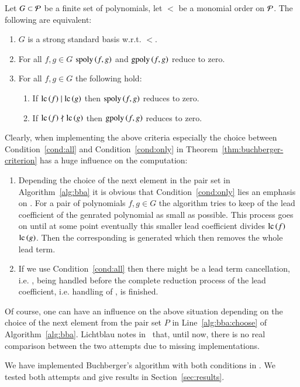\begin{theorem}
Let $G \subset \mathcal{P}$ be a finite set of polynomials, let $<$ be a monomial order
on $\mathcal{P}$. The following are equivalent:
\begin{enumerate}
\item $G$ is a strong standard basis w.r.t. $<$.
\item\label{cond:all} For all $f,g \in G$ $\mathrm{spoly}\left({f},{g}\right)$ and $\mathrm{gpoly}\left({f},{g}\right)$ reduce to zero.
\item\label{cond:only} For all $f,g \in G$ the following hold:
\begin{enumerate}
\item If $\mathrm{lc}\left({f}\right) \mid \mathrm{lc}\left({g}\right)$ then $\mathrm{spoly}\left({f},{g}\right)$ reduces to zero.
\item If $\mathrm{lc}\left({f}\right) \nmid \mathrm{lc}\left({g}\right)$ then $\mathrm{gpoly}\left({f},{g}\right)$ reduces to zero.
\end{enumerate}
\end{enumerate}
\label{thm:buchberger-criterion}
\end{theorem}

Clearly, when implementing the above criteria especially the choice between
Condition~\ref{cond:all} and Condition~\ref{cond:only} in
Theorem~\ref{thm:buchberger-criterion} has a huge influence on the computation:
\begin{enumerate}
\item Depending the choice of the next element in the pair set in
Algorithm~\ref{alg:bba} it is obvious that Condition~\ref{cond:only} lies an
emphasis on \gpts. For a pair of polynomials $f,g\in G$ the algorithm tries to
keep of the lead coefficient of the genrated polynomial as small as possible.
This process goes on until at some point eventually this smaller lead
coefficient divides $\mathrm{lc}\left({f}\right)$ $\mathrm{lc}\left({g}\right)$. Then the corresponding \spt is generated
which then removes the whole lead term.
\item If we use Condition~\ref{cond:all} then there might be a lead term
cancellation, i.e. \spt, being handled before the complete reduction process of
the lead coefficient, i.e. handling of \gpts, is finished.
\end{enumerate}

Of course, one can have an influence on the above situation depending on the
choice of the next element from the pair set $P$ in Line~\ref{alg:bba:choose} of
Algorithm~\ref{alg:bba}. Lichtblau notes in~\cite{lichtblau2012} that, until
now,
there is no real comparison between the two attempts due to missing
implementations.

We have implemented Buchberger's algorithm with both conditions
in \singular. We tested both attempts and give results in
Section~\ref{sec:results}.
